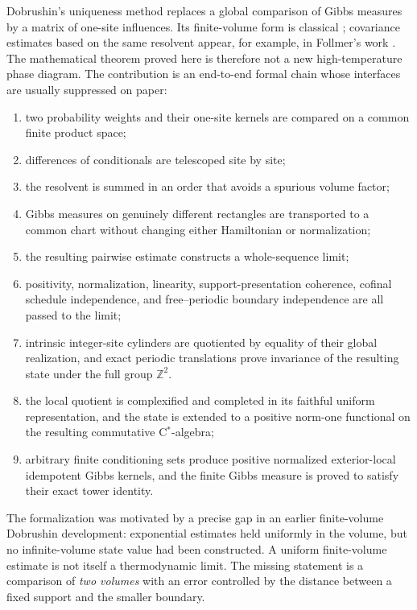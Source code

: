 \documentclass[11pt]{article}
\theoremstyle{definition}
\newcommand{\Z}{\mathbb Z}
\begin{document}
Dobrushin's uniqueness method replaces a global comparison of Gibbs measures
by a matrix of one-site influences.  Its finite-volume form is classical
\cite{Dobrushin1968,Dobrushin1970}; covariance estimates based on the same
resolvent appear, for example, in Follmer's work \cite{Follmer1982}.  The
mathematical theorem proved here is therefore not a new high-temperature phase
diagram.  The contribution is an end-to-end formal chain whose interfaces are
usually suppressed on paper:
\begin{enumerate}
\item two probability weights and their one-site kernels are compared on a
  common finite product space;
\item differences of conditionals are telescoped site by site;
\item the resolvent is summed in an order that avoids a spurious volume factor;
\item Gibbs measures on genuinely different rectangles are transported to a
  common chart without changing either Hamiltonian or normalization;
\item the resulting pairwise estimate constructs a whole-sequence limit;
\item positivity, normalization, linearity, support-presentation coherence,
  cofinal schedule independence, and free--periodic boundary independence are
  all passed to the limit;
\item intrinsic integer-site cylinders are quotiented by equality of their
  global realization, and exact periodic translations prove invariance of the
  resulting state under the full group $\Z^2$.
\item the local quotient is complexified and completed in its faithful uniform
  representation, and the state is extended to a positive norm-one functional
  on the resulting commutative C$^*$-algebra;
\item arbitrary finite conditioning sets produce positive normalized
  exterior-local idempotent Gibbs kernels, and the finite Gibbs measure is
  proved to satisfy their exact tower identity.
\end{enumerate}

The formalization was motivated by a precise gap in an earlier finite-volume
Dobrushin development: exponential estimates held uniformly in the volume,
but no infinite-volume state value had been constructed.  A uniform
finite-volume estimate is not itself a thermodynamic limit.  The missing
statement is a comparison of \emph{two volumes} with an error controlled by
the distance between a fixed support and the smaller boundary.
\end{document}
